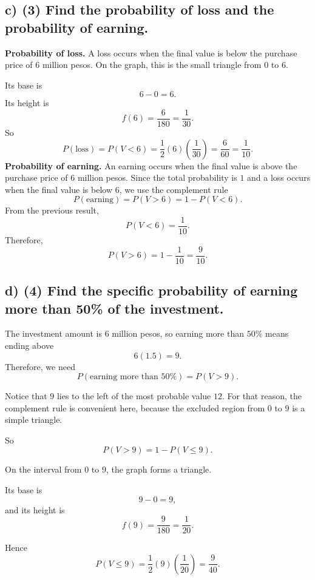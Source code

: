 	
	\subsection*{c) \textbf{(3)} Find the probability of loss and the probability of earning.}
	\label{subsec:small-business-investment-c3-c}
	\textbf{Probability of loss.} A loss occurs when the final value is below the purchase price of $6$ million pesos. On the graph, this is the small triangle from $0$ to $6$.
	
	Its base is
	\[
	6-0=6.
	\]
	Its height is
	\[
	f(6)=\frac{6}{180}=\frac{1}{30}.
	\]
	So
	\[
	P(\text{loss})=P(V<6)=\frac12(6)\left(\frac{1}{30}\right)=\frac{6}{60}=\frac{1}{10}.
	\]
	\textbf{Probability of earning.}
	An earning occurs when the final value is above the purchase price of $6$ million pesos. Since the total probability is $1$ and a loss occurs when the final value is below $6$, we use the complement rule
	\[
	P(\text{earning})=P(V>6)=1-P(V<6).
	\]
	From the previous result,
	\[
	P(V<6)=\frac{1}{10}.
	\]
	Therefore,
	\[
	P(V>6)=1-\frac{1}{10}=\frac{9}{10}.
	\]
	
	
	\subsection*{d) \textbf{(4)} Find the specific probability of earning more than 50\% of the investment.}
	\label{subsec:small-business-investment-c3-d}
	The investment amount is $6$ million pesos, so earning more than $50\%$ means ending above
	\[
	6(1.5)=9.
	\]
	Therefore, we need
	\[
	P(\text{earning more than }50\%)=P(V>9).
	\]
	
	Notice that $9$ lies to the left of the most probable value $12$. For that reason, the complement rule is convenient here, because the excluded region from $0$ to $9$ is a simple triangle.
	
	So
	\[
	P(V>9)=1-P(V\le 9).
	\]
	
	On the interval from $0$ to $9$, the graph forms a triangle.
	
	Its base is
	\[
	9-0=9,
	\]
	and its height is
	\[
	f(9)=\frac{9}{180}=\frac{1}{20}.
	\]
	
	Hence
	\[
	P(V\le 9)=\frac12(9)\left(\frac{1}{20}\right)=\frac{9}{40}.
	\]
	
